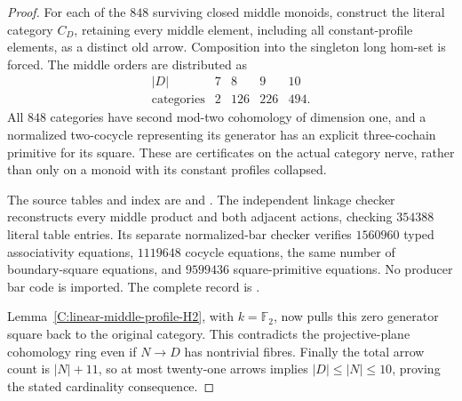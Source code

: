 \begin{proof}
For each of the $848$ surviving closed middle monoids, construct
the literal category $C_D$, retaining every middle element,
including all constant-profile elements, as a distinct old
arrow.  Composition into the singleton long hom-set is forced.
The middle orders are distributed as
\[
\begin{array}{c|rrrr}
 |D|&7&8&9&10\\\hline
 \text{categories}&2&126&226&494.
\end{array}
\]
All $848$ categories have second mod-two cohomology of dimension
one, and a normalized two-cocycle representing its generator
has an explicit three-cochain primitive for its square.
These are certificates on the actual category nerve, rather
than only on a monoid with its constant profiles collapsed.

The source tables and index are
 and
.
The independent linkage checker reconstructs every middle
product and both adjacent actions, checking $354388$ literal
table entries.  Its separate normalized-bar checker verifies
$1560960$ typed associativity equations, $1119648$ cocycle
equations, the same number of boundary-square equations, and
$9599436$ square-primitive equations.  No producer bar code is
imported.  The complete record is
.

Lemma~\ref{C:linear-middle-profile-H2}, with $k=\mathbb F_2$,
now pulls this zero generator square back to the original
category.  This contradicts the projective-plane cohomology
ring even if $N\to D$ has nontrivial fibres.  Finally the
total arrow count is $|N|+11$, so at most twenty-one arrows
implies $|D|\le|N|\le10$, proving the stated cardinality
consequence.
\end{proof}
